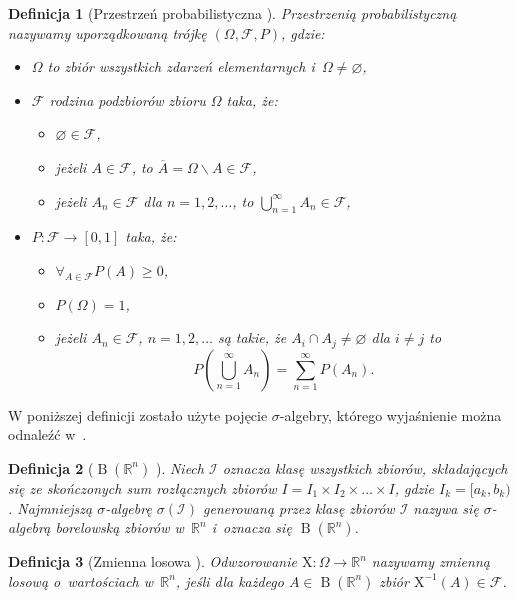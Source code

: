 \documentclass[12pt,a4paper]{report}
\newtheorem{df}{Definicja}[chapter]
\newcommand{\setR}{\mathbb{R}}
\newcommand{\sigmacialo}[1]{\operatorname{B}\left({#1} \right)}
\begin{document}
\begin{df}[Przestrzeń probabilistyczna {\citep[Sec 1.2, Sec 1.4]{wztp}}]
Przestrzenią probabilistyczną nazywamy uporządkowaną trójkę $(\Omega, \mathcal{F}, P)$, gdzie:
\begin{itemize}
\item $\Omega$ to zbiór wszystkich zdarzeń elementarnych i~$\Omega \neq \varnothing$,
\item $ \mathcal{F} $ rodzina podzbiorów zbioru $\Omega$ taka, że:
\begin{itemize}
\item $\varnothing \in \mathcal{F} $,
\item jeżeli $ \mathit{A} \in \mathcal{F}$, to $\overline{\mathit{A}} = \Omega \backslash \mathit{A} \in \mathcal{F}$,
\item jeżeli $ \mathit{A}_n \in \mathcal{F}$ dla $n=1,2,\ldots$, to $\bigcup_{n=1}^{\infty} \mathit{A}_n \in \mathcal{F}$,
\end{itemize}
\item $P : \mathcal{F} \to [0,1]$ taka, że:
\begin{itemize}
\item $\forall_{\mathit{A} \in \mathcal{F}} P(\mathit{A}) \geq 0$,
\item $P(\Omega) = 1$,
\item jeżeli $ \mathit{A}_n \in \mathcal{F}$, $n=1,2,\ldots$ są takie, że $\mathit{A}_i \cap \mathit{A}_j \neq \varnothing$ dla $i \neq j$ to
$$
P(\bigcup_{n=1}^{\infty} \mathit{A}_n) = \sum_{n=1}^{\infty} P(\mathit{A}_n).
$$
\end{itemize}
\end{itemize}
\end{df}

W poniższej definicji zostało użyte pojęcie $\sigma$-algebry, którego wyjaśnienie można odnaleźć w~{\citep[Sec 1.2 Def. 1.2]{wztp}}.

\begin{df}[$\sigmacialo{\setR^n}$ {\citep[Sec 1.12]{wztp}}]
Niech $\mathcal{I}$ oznacza klasę wszystkich zbiorów, składających się ze skończonych sum rozłącznych zbiorów $\mathit{I} = \mathit{I}_1 \times \mathit{I}_2 \times \ldots \times \mathit{I}$, gdzie $\mathit{I}_k = [a_k,b_k)$.
Najmniejszą $\sigma$-algebrę $\sigma(\mathcal{I})$ generowaną przez klasę zbiorów $\mathcal{I}$ nazywa się $\sigma$-algebrą borelowską zbiorów w~$\setR^n$ i~oznacza się $\sigmacialo{\setR^n}$.
\end{df}

\begin{df}[Zmienna losowa {\citep[Sec 5.1 Def. 1]{jakubowski}}]
Odwzorowanie $\mathrm{X}: \Omega \to \setR^n$ nazywamy zmienną losową o~wartościach w~$\setR^n$, jeśli dla każdego $\mathit{A} \in \sigmacialo{\setR^n}$ zbiór $\mathrm{X}^{-1}(\mathit{A}) \in \mathcal{F}$.
\end{df}
\end{document}
